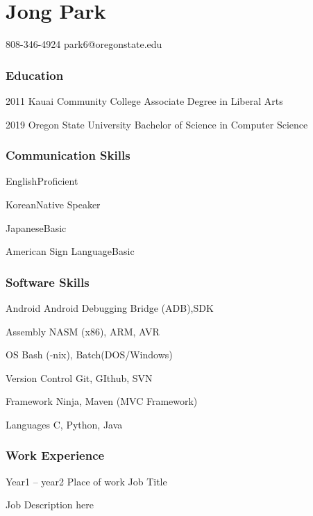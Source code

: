 \documentclass{tccv}
\begin{document}
	
\part{Jong Park}
	{808-346-4924}
	{park6@oregonstate.edu}
	
\section{Education}
	\begin{yearlist}
		\item{2011}
			{Kauai Community College}
			{Associate Degree in Liberal Arts}
		\item {2019}
			{Oregon State University}
			{Bachelor of Science in Computer Science}
	\end{yearlist}


\section {Communication Skills}
	\begin{factlist}
		\item {English}{Proficient}
		\item {Korean}{Native Speaker}
		\item {Japanese}{Basic}
		\item {American Sign Language}{Basic}
	\end{factlist}

\section{Software Skills}
	\begin{factlist}
		\item {Android}
			{Android Debugging Bridge (ADB),SDK}
		\item {Assembly}
			{NASM (x86), ARM, AVR}
		\item {OS}
			{Bash (-nix), Batch(DOS/Windows)}
		\item {Version Control}
			{Git, GIthub, SVN}
		\item{Framework}
			{Ninja, Maven (MVC Framework)}
		\item{Languages}
			{C, Python, Java}
		
	\end{factlist}


\section{Work Experience}
	\begin{eventlist}
	
		\item {Year1 -- year2}
		{Place of work}
		{Job Title}
	
		Job Description here	
	\end{eventlist}


		
\end{document}
